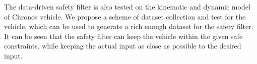 The data-driven safety filter is also tested on the kinematic and dynamic model of Chronos vehicle.
We propose a scheme of dataset collection and test for the vehicle, which can be used to generate a rich enough dataset for the safety filter.
It can be seen that the safety filter can keep the vehicle within the given safe constraints, while keeping the actual input as close as possible to the desired input.

 \cleardoublepage







